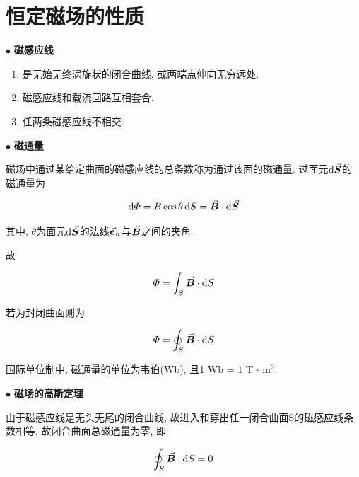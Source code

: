 \section{恒定磁场的性质}\label{8.3}

$\bullet$ \textbf{磁感应线}

\begin{enumerate}[itemindent=1em]
	
	\item 是无始无终涡旋状的闭合曲线, 或两端点伸向无穷远处. 
	
	\item 磁感应线和载流回路互相套合. 
	
	\item 任两条磁感应线不相交. 
	
\end{enumerate}

$\bullet$ \textbf{磁通量}

\begin{definition}[磁通量]
	
	磁场中通过某给定曲面的磁感应线的总条数称为通过该面的磁通量. 过面元$\dd{\va*{S}}$的磁通量为
	
	\begin{equation*}
		\dd{\varPhi} = B \cos \theta \dd{S} = \va*{B} \cdot \dd{\va*{S}}
	\end{equation*}
	
	其中, $\theta$为面元$\dd{\va*{S}}$的法线$\va*{e}_n$与$\va*{B}$之间的夹角. 
	
	故
	
	\begin{equation}
		\varPhi = \int_{S} \va*{B} \cdot \dd{S} \label{C8-eq5}
	\end{equation}
	
	若为封闭曲面则为
	
	\begin{equation}
		\varPhi = \oint_{S} \va*{B} \cdot \dd{S} \label{C8-eq6}
	\end{equation}
	
	国际单位制中, 磁通量的单位为韦伯(Wb), 且1 Wb = 1 T $\cdot$ m$^2$.
	
\end{definition}

$\bullet$ \textbf{磁场的高斯定理}

\begin{definition}[磁场的高斯定理]
	由于磁感应线是无头无尾的闭合曲线, 故进入和穿出任一闭合曲面S的磁感应线条数相等, 故闭合曲面总磁通量为零, 即
	
	\begin{equation}
		\oint_{S} \va*{B} \cdot \dd{S} = 0 \label{C8-eq7}
	\end{equation}

\end{definition}

